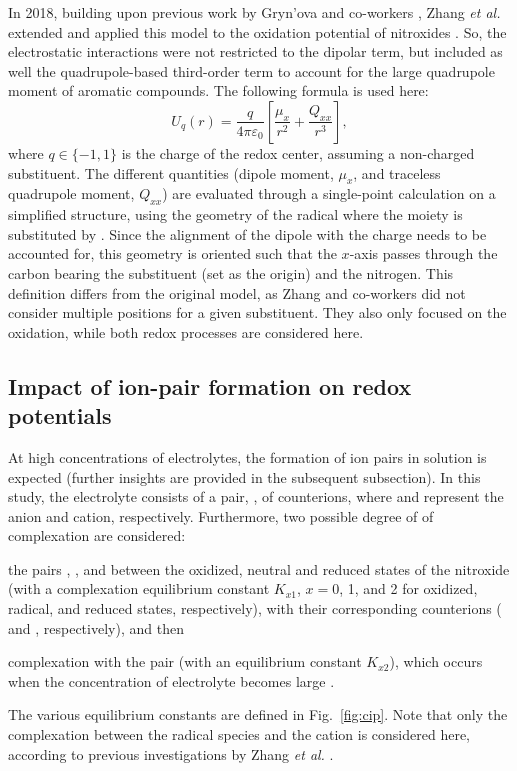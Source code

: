 \documentclass[review,preprint]{elsarticle}
\begin{document}
In 2018, building upon previous work by Gryn'ova and co-workers \cite{grynovaOriginScopeLongRange2013,grynovaSwitchingRadicalStability2013}, Zhang \textit{et al.} extended and applied this model to the oxidation potential of nitroxides \cite{zhangEffectHeteroatomFunctionality2018}. So, the electrostatic interactions were not restricted to the dipolar term, but included as well the quadrupole-based third-order term to account for the large quadrupole moment of aromatic compounds. The following formula is used here:
\begin{equation}
	U_q(r) =\frac{q}{4\pi\varepsilon_0} \left[\frac{\mu_x}{r^2} + \frac{Q_{xx}}{r^3}\right], \label{eq:Er}
\end{equation}
where $q \in \{-1, 1\}$ is the charge of the redox center, assuming a non-charged substituent. The different quantities (dipole moment, $\mu_x$, and traceless quadrupole moment, $Q_{xx}$) are evaluated through a single-point calculation on a simplified structure, using the geometry of the radical where the  moiety is substituted by . Since the alignment of the dipole with the charge needs to be accounted for, this geometry is oriented such that the $x$-axis passes through the  carbon bearing the substituent (set as the origin) and the nitrogen. This definition differs from the original model, as Zhang and co-workers \cite{zhangEffectHeteroatomFunctionality2018} did not consider multiple positions for a given substituent. They also only focused on the oxidation, while both redox processes are considered here.


\subsection{Impact of ion-pair formation on redox potentials}

At high concentrations of electrolytes, the formation of ion pairs in solution is expected (further insights are provided in the subsequent subsection). In this study, the electrolyte consists of a pair, , of counterions, where  and  represent the anion and cation, respectively. Furthermore, two possible degree of of complexation are considered: \begin{inparaenum}[(i)]
	\item the pairs , , and  between the oxidized, neutral and reduced states of the nitroxide  (with a complexation equilibrium constant $K_{x1}$, $x=0$, 1, and 2 for oxidized, radical, and reduced states, respectively), with their corresponding counterions ( and , respectively), and then
	\item complexation with the  pair (with an equilibrium constant $K_{x2}$), which occurs when the concentration of electrolyte becomes large \cite{wylieImprovedPerformanceAllOrganic2019a}.
\end{inparaenum}
The various equilibrium constants are defined in Fig.~\ref{fig:cip}. Note that only the complexation between the radical species and the cation is considered here, according to previous investigations by Zhang \textit{et al.} \cite{zhangInteractionsImidazoliumBasedIonic2016,zhangEffectHeteroatomFunctionality2018}.
\end{document}

